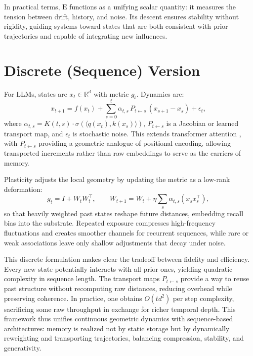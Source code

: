 \documentclass[a4paper,12pt]{article}
\newcommand{\E}{\mathrm{E}}
\begin{document}
In practical terms, $\E$ functions as a unifying scalar quantity: it measures the tension 
between drift, history, and noise. Its descent ensures stability without rigidity, guiding 
systems toward states that are both consistent with prior trajectories and capable of 
integrating new influences.

\section{Discrete (Sequence) Version}
For LLMs, states are $x_t \in \mathbb{R}^d$ with metric $g_t$. Dynamics are:
\[
x_{t+1} = f(x_t) + \sum_{s=0}^t \alpha_{t,s} \, P_{t \leftarrow s} \, (x_{s+1} - x_s) + \epsilon_t,
\]
where $\alpha_{t,s} = K(t,s) \cdot \sigma(\langle q(x_t), k(x_s) \rangle)$, 
$P_{t \leftarrow s}$ is a Jacobian or learned transport map, and $\epsilon_t$ is 
stochastic noise. This extends transformer attention \citep{vaswani2017attention}, 
with $P_{t \leftarrow s}$ providing a geometric analogue of positional encoding, 
allowing transported increments rather than raw embeddings to serve as the carriers 
of memory.

Plasticity adjusts the local geometry by updating the metric as a low-rank deformation:
\[
g_t = I + W_t W_t^\top, \qquad W_{t+1} = W_t + \eta \sum_s \alpha_{t,s} (x_s x_s^\top),
\]
so that heavily weighted past states reshape future distances, embedding recall bias 
into the substrate. Repeated exposure compresses high-frequency fluctuations and 
creates smoother channels for recurrent sequences, while rare or weak associations 
leave only shallow adjustments that decay under noise.

This discrete formulation makes clear the tradeoff between fidelity and efficiency. 
Every new state potentially interacts with all prior ones, yielding quadratic 
complexity in sequence length. The transport maps $P_{t \leftarrow s}$ provide a way 
to reuse past structure without recomputing raw distances, reducing overhead while 
preserving coherence. In practice, one obtains $O(t d^2)$ per step complexity, 
sacrificing some raw throughput in exchange for richer temporal depth. This framework 
thus unifies continuous geometric dynamics with sequence-based architectures: memory 
is realized not by static storage but by dynamically reweighting and transporting 
trajectories, balancing compression, stability, and generativity.
\end{document}
